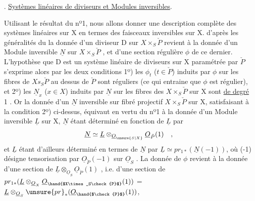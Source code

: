 
. \uline{Systèmes linéaires de diviseurs et Modules inversibles}.

Utilisant le résultat du nº1, nous allons donner une description
complète des systèmes linéaires sur X en termes des faisceaux inversibles
sur X.   d'après les généralités du  la donnée d'un
diviseur  D sur $X\times_S\check{P}$  revient à la
donnée d'un Module inversible $\underline{N}$ sur $X\times_S\check{P}$ , et d'une section régulière
$\phi$ de ce dernier.  L'hypothèse que D est un système linéaire de
diviseurs sur X paramétrée par $\check{P}$ s'exprime alors par les deux conditions
1º) les $\phi_t$ ($t\in\check{P}$) induits par $\phi$ sur les fibres de $Xs_S\check{P}$ au dessus de $\check{P}$
sont réguliers (ce qui entraine que $\phi$ est régulier), et 2º) les $\underline{N}_x$ ($x\in X$)
induits par $\underline{N}$  sur les fibres des $X\times_S\check{P}$ sur X sont \uline{de degré} 1 .
Or la donnée d'un $\underline{N}$ inversible sur  fibré projectif $X\times_S\check{P}$ sur X,
satisfaisant à la condition 2º) ci-dessus, équivaut en vertu du nº1
à la donnée d'un Module inversible $\underline{L}$ sur X, $\underline{N}$ étant déterminé en fonction
de $\underline{L}$ par
\[ \underline{N}\simeq\underline{L}\otimes_{\underline{O}_{\unsure{S|X}}}\underline{O}_{\check{P}}(1) \quad , \]
et $\underline{L}$ étant d'ailleurs déterminé en termes de $\underline{N}$ par $\underline{L}\simeq pr_{1*}(\underline{N}(-1))$,
où (-1) désigne  tensorisation par $\underline{O}_{\check{P}}(-1)$ sur $\underline{O}_S$ . La donnée de $\phi$
revient à la donnée d'une section de $\underline{L}\otimes_{\underline{O}_S}\underline{O}_{\check{P}}(1)$ , i.e. d'une section
de $pr_{1*}(\underline{L}\otimes_{\underline{O}_X}\underline{O}_{\hand{$X\times_S\check{P}$}}(1))$ = $\underline{L}\otimes_{\underline{O}_S}\unsure{pr}_*(\underline{O}_{\hand{$\check{P}$}}(1))$, 
